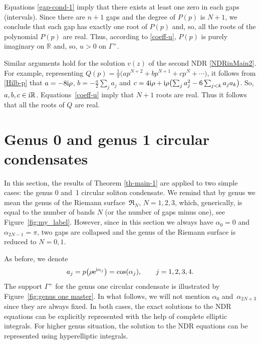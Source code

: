 \documentclass[pdftex]{sigma}
\numberwithin{equation}{section}
\newcommand{\G}{\Gamma}
\def\R{{\mathbb R}}
\def\a{\alpha}
\def\r{\rho}
\def\G{\Gamma}
\def\r{\rho}
\begin{document}
Equations \eqref{gap-cond-1} imply
that there exists at least one zero in each gaps (intervals). Since there are $n+1$ gaps and the degree of $P(p)$ is $N+1$, we conclude that each gap has exactly one root of $P(p)$ and, so, all the roots of the polynomial $P(p)$ are real. Thus, according to \eqref{coeff-u}, $P(p)$ is purely imaginary on $\R$ and, so, $u>0$ on $\G^+$.

Similar arguments hold for the solution $v(z)$ of the second NDR \eqref{NDRinMain2}.
For example, representing $Q(p)=\frac{1}{\pi}\bigl(ap^{N+2}+bp^{N+1}+cp^N+\cdots\bigr)$, it follows from \eqref{Hilb-p} that $a=-8{\rm i}\r $, $b=-\frac a2 \sum_j a_j$ and $c=4{\rm i}\r +{\rm i}\r \bigl(\sum_{j}a_j^2-6\sum_{j<k}a_ja_k\bigr)$. So, $a,b,c\in {\rm i}\R$. Equations~\eqref{coeff-u} imply that $N+1$ roots are real. Thus it follows that all the roots of $Q$ are real.

\section{Genus 0 and genus 1 circular condensates}\label{s3}
In this section, the results of Theorem \ref{th-main-1} are applied to two simple cases: the genus 0 and~1 circular soliton condensate.
We remind that by genus we mean the genus of the Riemann surface~$\mathfrak R_N$, $N=1,2,3$, which, generically, is equal to the number of bands $N$ (or the number of gaps minus one), see Figure~\ref{fig:my_label}.
However, since in this section we always have $\alpha_0=0$ and $\alpha_{2N-1}=\pi$, two gaps are collapsed and the genus of the Riemann surface is reduced to $N=0,1$.

As before, we denote
\[
a_j=p\bigl(\r {\rm e}^{{\rm i}\a_j}\bigr)=\cos(\alpha_j), \qquad j=1,2,3,4.
\]
 The support $\G^+$ for the genus one circular condensate is illustrated by Figure~\ref{fig:genus one master}. In what follows, we will not mention $\a_0$ and~$\a_{2N+3}$ since they are always fixed.
In both cases, the exact solutions to the NDR equations can be explicitly represented with the help of complete elliptic integrals. For higher genus situation, the solution to the NDR equations can be represented using hyperelliptic integrals.
\end{document}
